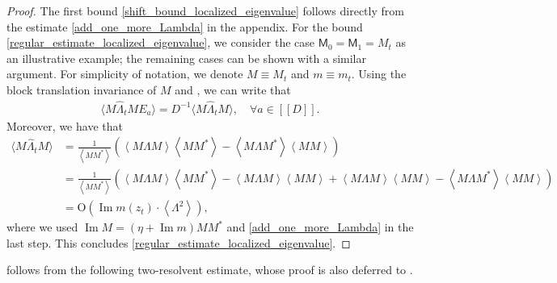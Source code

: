 \documentclass[10pt,reqno]{amsart}
\numberwithin{equation}{section}
\numberwithin{figure}{section}
\theoremstyle{plain} %
\theoremstyle{definition} %
\newtheorem{remark}[theorem]{Remark}
\newcommand{\wh}{\widehat}
\newcommand{\sM}{\mathsf M}
\newcommand{\qq}[1]{[\![{#1}]\!]}
\newcommand{\pa}[1]{\left({#1}\right)}
\newcommand{\avg}[1]{\langle #1 \rangle}
\newcommand{\avga}[1]{\left\langle #1 \right\rangle}
\DeclareMathOperator{\im}{\mathrm{Im}}
\newcommand{\hLambda}{{\wh{\Lambda}}}
\newcommand{\OO}{\mathrm{O}}
\numberwithin{equation}{section}
\begin{document}
\begin{proof}
The first bound \eqref{shift_bound_localized_eigenvalue} follows directly from the estimate \eqref{add_one_more_Lambda} in the appendix. For the bound \eqref{regular_estimate_localized_eigenvalue}, we consider the case $\sM_0 = \sM_1 = M_t$ as an illustrative example; the remaining cases can be shown with a similar argument. For simplicity of notation, we denote $M\equiv M_t$ and $m\equiv m_t$. %
Using the block translation invariance of $M$ and \smash{$\hLambda_t$}, we can write that
    \begin{equation}\nonumber
        \begin{aligned}
            \avg{M\hLambda_t M E_a}= {D}^{-1}\avg{M \hLambda_t M},\quad \forall a\in \qq{D}.
        \end{aligned}
    \end{equation}
Moreover, we have that
    \begin{equation}\nonumber
        \begin{aligned}
            \avg{M \hLambda_t M}&=\frac{1}{\avga{MM^*}}\pa{\avga{M\Lambda M}\avga{MM^*}-\avga{M\Lambda M^*}\avga{M M}}\\
            &= \frac{1}{\avga{MM^*}}\pa{\avga{M\Lambda M}\avga{MM^*}-\avga{M\Lambda M}\avga{MM}+\avga{M\Lambda M}\avga{MM}-\avga{M\Lambda M^*}\avga{M M}}\\
            &= \OO\pa{\im m(z_t)\cdot \avga{\Lambda^2}},
        \end{aligned}
    \end{equation}
    where we used $\im M=\pa{\eta+\im m}MM^*$ and \eqref{add_one_more_Lambda} in the last step. This concludes \eqref{regular_estimate_localized_eigenvalue}.
\end{proof}



 follows from the following two-resolvent estimate, whose proof is also deferred to .
 
\end{document}
